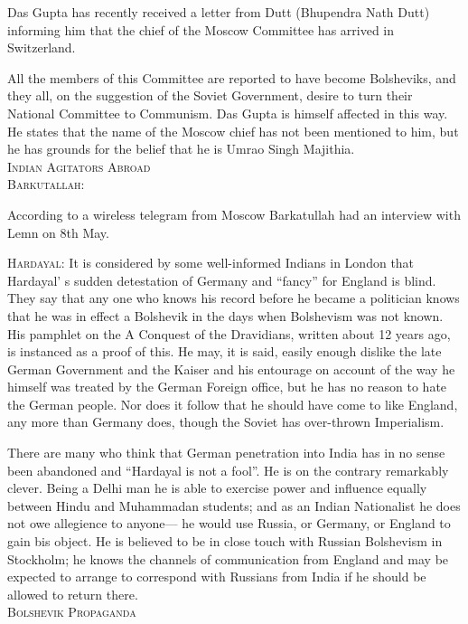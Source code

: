 Das Gupta has recently received a letter from Dutt (Bhupendra Nath Dutt) informing him that the chief of the Moscow Committee has arrived in Switzerland. 

All the members of this Committee are reported to have become Bolsheviks, and they all, on the suggestion of the Soviet Government, desire to turn their National Committee to Communism. Das Gupta is himself affected in this way. He states that the name of the Moscow chief has not been mentioned to him, but he has grounds for the belief that he is Umrao Singh Majithia.\\ 

\textsc{Indian Agitators Abroad }\\

\textsc{Barkutallah:} 

According to a wireless telegram from Moscow Barkatullah had an interview with Lemn on 8th May. 

\textsc{Hardayal:} It is considered by some well-informed Indians in London that Hardayal' s sudden detestation of Germany and “fancy” for England is blind. They say that any one who knows his record before he became a politician knows that he was in effect a Bolshevik in the days when Bolshevism was not known. His pamphlet on the A Conquest of the Dravidians, written about 12 years ago, is instanced as a proof of this. 
He may, it is said, easily enough dislike the late German Government and the Kaiser and his entourage on account of the way he himself was treated by the German Foreign office, but he has no reason to hate the German people. Nor does it follow that he should have come to like England, any more than Germany does, though the Soviet has over-thrown Imperialism. 

There are many who think that German penetration into India has in no sense been abandoned and “Hardayal is not a fool”. He is on the contrary remarkably clever. Being a Delhi man he is able to exercise power and influence equally between Hindu and Muhammadan students; and as an Indian Nationalist he does not owe allegience to anyone— he would use Russia, or Germany, or England to gain bis object. He is believed to be in close touch with Russian Bolshevism in Stockholm; he knows the channels of communication from England and may be expected to arrange to correspond with Russians from India if he should be allowed to return there. \\

\textsc{Bolshevik Propaganda}\\ 


